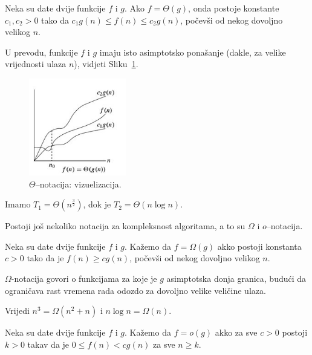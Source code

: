 \begin{definition}
Neka su date dvije funkcije $f$ i $g$.  Ako $f = \Theta(g)$, onda postoje konstante $c_1, c_2 >0$ tako da $c_1 g(n) \leq f(n) \leq c_2 g(n)$, počevši od nekog dovoljno velikog $n$. 
\end{definition}

U prevodu, funkcije $f$ i $g$ imaju isto asimptotsko ponašanje (dakle, za velike vrijednosti ulaza $n$), vidjeti Sliku~\ref{fig:theta_notation}. 

\begin{figure}[H]
	\centering
	\includegraphics[width=120pt,height=120pt]{slike/theta_notation.jpg}
 
	\caption{$\Theta$--notacija: vizuelizacija.}	\label{fig:theta_notation}
\end{figure}

\begin{example}
Imamo	$T_1 = \Theta(n^{\frac{3}{2}})$, dok je $T_2 = \Theta(n \log n)$.  
\end{example}

Postoji još nekoliko notacija za kompleksnost algoritama, a to su $\Omega$ i $o$--notacija.

\begin{definition}
 Neka su date dvije funkcije $f$ i $g$. Kažemo da $f = \Omega(g)$ akko postoji konstanta $c >0$ tako da je $f(n) \geq c g(n)$, počevši od nekog dovoljno velikog $n$.  
\end{definition}
$\Omega$-notacija govori o funkcijama za koje je $g$ asimptotska donja granica, budući da ograničava rast vremena rada odozdo za dovoljno velike veličine ulaza.

\begin{example}
  Vrijedi $n^3= \Omega(n^2 + n)$ i $n\log n = \Omega(n)$.
\end{example}

\begin{definition}
	Neka su date dvije funkcije $f$ i $g$. Kažemo da $f = o(g)$ akko za sve $c > 0$ postoji   $k > 0$ takav da je $0 \leq f(n) < cg(n)$ za sve $n \geq k$. 
	
\end{definition}

